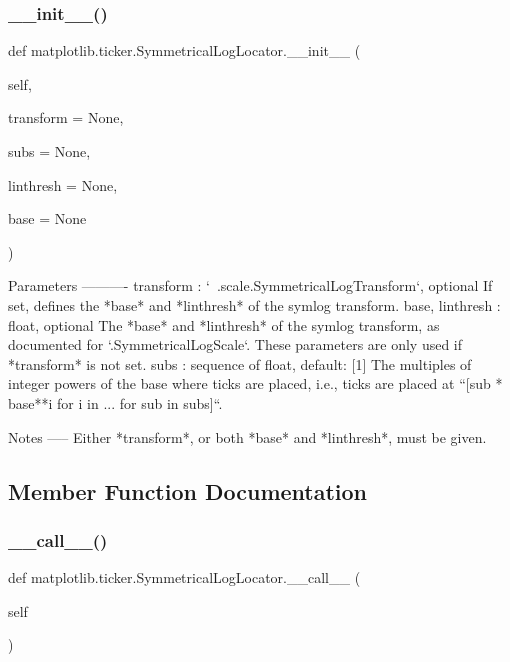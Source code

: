 \subsubsection{\texorpdfstring{\+\_\+\+\_\+init\+\_\+\+\_\+()}{\_\_init\_\_()}}
{\footnotesize\ttfamily def matplotlib.\+ticker.\+Symmetrical\+Log\+Locator.\+\_\+\+\_\+init\+\_\+\+\_\+ (\begin{DoxyParamCaption}\item[{}]{self,  }\item[{}]{transform = {\ttfamily None},  }\item[{}]{subs = {\ttfamily None},  }\item[{}]{linthresh = {\ttfamily None},  }\item[{}]{base = {\ttfamily None} }\end{DoxyParamCaption})}

\begin{DoxyVerb}Parameters
----------
transform : `~.scale.SymmetricalLogTransform`, optional
    If set, defines the *base* and *linthresh* of the symlog transform.
base, linthresh : float, optional
    The *base* and *linthresh* of the symlog transform, as documented
    for `.SymmetricalLogScale`.  These parameters are only used if
    *transform* is not set.
subs : sequence of float, default: [1]
    The multiples of integer powers of the base where ticks are placed,
    i.e., ticks are placed at
    ``[sub * base**i for i in ... for sub in subs]``.

Notes
-----
Either *transform*, or both *base* and *linthresh*, must be given.
\end{DoxyVerb}
 

\subsection{Member Function Documentation}
\mbox{\label{classmatplotlib_1_1ticker_1_1SymmetricalLogLocator_a9053802f4a57b25e0bb024321504660e}} 
\subsubsection{\texorpdfstring{\+\_\+\+\_\+call\+\_\+\+\_\+()}{\_\_call\_\_()}}
{\footnotesize\ttfamily def matplotlib.\+ticker.\+Symmetrical\+Log\+Locator.\+\_\+\+\_\+call\+\_\+\+\_\+ (\begin{DoxyParamCaption}\item[{}]{self }\end{DoxyParamCaption})}

